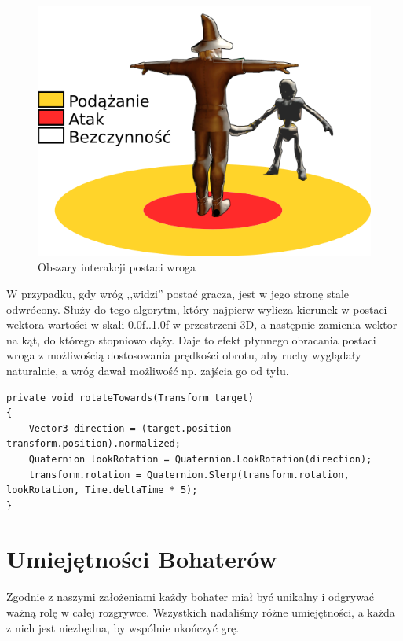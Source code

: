 \documentclass[openright]{xmgr}
\begin{document}
    \begin{figure}[H]
    \center
    \includegraphics[width=\textwidth]{poruszanie_wrogow_1.png}
    \caption{Obszary interakcji postaci wroga}
    \end{figure}

    W przypadku, gdy wróg ,,widzi'' postać gracza, jest w jego stronę stale odwrócony. Służy do tego algorytm, który najpierw wylicza kierunek w postaci wektora wartości w skali 0.0f..1.0f w przestrzeni 3D, a następnie zamienia wektor na kąt, do którego stopniowo dąży. Daje to efekt płynnego obracania postaci wroga z możliwością dostosowania prędkości obrotu, aby ruchy wyglądały naturalnie, a wróg dawał możliwość np. zajścia go od tyłu.

\begin{minipage}{\textwidth}
\begin{lstlisting}[caption={Algorytm obracania postaci wroga w kierunku gracza}]
private void rotateTowards(Transform target)
{
    Vector3 direction = (target.position - transform.position).normalized;
    Quaternion lookRotation = Quaternion.LookRotation(direction);
    transform.rotation = Quaternion.Slerp(transform.rotation, lookRotation, Time.deltaTime * 5);
}
\end{lstlisting}
\end{minipage}

  \section{Umiejętności Bohaterów}

    Zgodnie z naszymi założeniami każdy bohater miał być unikalny i odgrywać ważną rolę w całej rozgrywce. Wszystkich nadaliśmy różne umiejętności, a każda z nich jest niezbędna, by wspólnie ukończyć grę.
\end{document}
